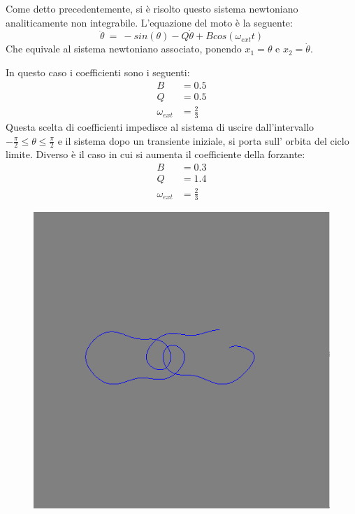 Come detto precedentemente, si è risolto questo sistema newtoniano analiticamente non integrabile. L'equazione del moto è la seguente:
$$
  \ddot{\theta} \ = \ -sin(\theta) -Q \dot{\theta}+B cos(\omega_{ext} t)
$$
Che equivale al sistema newtoniano associato, ponendo $ x_1 = \theta $ e $x_2 = \dot{\theta}$.

In questo caso i coefficienti sono i seguenti:
\begin{align*}
B \ & = 0.5\\
Q & = 0.5 \\
\omega_{ext} &= \tfrac{2}{3}
\end{align*}
Questa scelta di coefficienti impedisce al sistema di uscire dall'intervallo $ -\tfrac{\pi}{2} \leq \theta \leq \tfrac{\pi}{2}$ e il sistema dopo un transiente iniziale,
si porta sull' orbita del ciclo limite.
Diverso è il caso in cui si aumenta il coefficiente della forzante:
\begin{align*}
B \ & = 0.3\\
Q & = 1.4 \\
\omega_{ext} &= \tfrac{2}{3}
\end{align*}
\begin{figure}[!h]
\centering
\includegraphics[width=0.7\columnwidth]{sovra1.png}
\end{figure}


